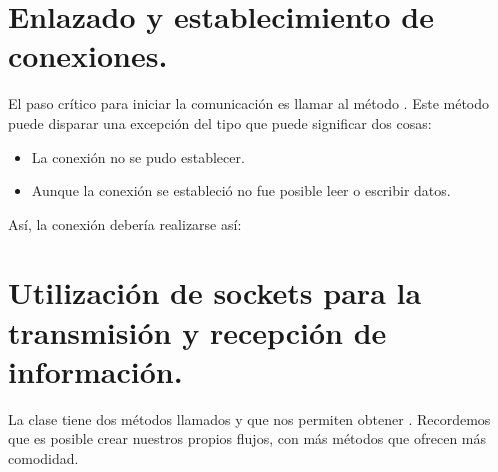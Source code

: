 \documentclass[letterpaper,10pt,spanish]{sphinxmanual}
\begin{document}
\section{Enlazado y establecimiento de conexiones.}
\label{\detokenize{textos/tema3:enlazado-y-establecimiento-de-conexiones}}
El paso crítico para iniciar la comunicación es llamar al método . Este método puede disparar una excepción del tipo  que puede significar dos cosas:
\begin{itemize}
\item {} 
La conexión no se pudo establecer.

\item {} 
Aunque la conexión se estableció no fue posible leer o escribir datos.

\end{itemize}

Así, la conexión debería realizarse así:

%
\begin{sphinxVerbatim}[commandchars=\\\{\}]
 

         
         

  
   
 
\end{sphinxVerbatim}


\section{Utilización de sockets para la transmisión y recepción de información.}
\label{\detokenize{textos/tema3:utilizacion-de-sockets-para-la-transmision-y-recepcion-de-informacion}}
La clase  tiene dos métodos llamados  y  que nos permiten obtener . Recordemos que es posible crear nuestros propios flujos, con más métodos que ofrecen más comodidad.
\end{document}
